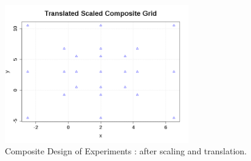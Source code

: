              \begin{figure}[H]
               \begin{center}
                 \includegraphics[width=8cm]{Figures/TranslatedScaledCompositeGrid.png}
               \end{center}
               \caption{Composite Design of Experiments  : after scaling and translation.}
               \label{TranslatedScaledCompositeGrid}
             \end{figure}


